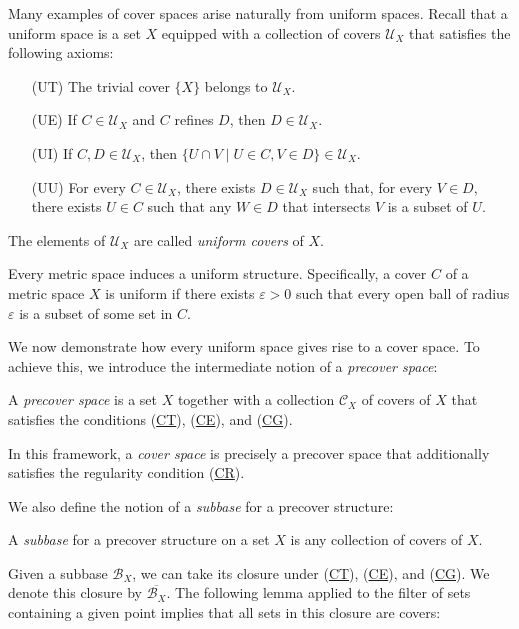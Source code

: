 \documentclass[reqno]{amsart}
\newcommand{\axitem}[1]{\phantomsection \label{ax:#1}}
\newcommand{\axref}[1]{(\hyperref[ax:#1]{#1})}
\theoremstyle{definition}
\theoremstyle{remark}
\numberwithin{figure}{section}
\begin{document}
Many examples of cover spaces arise naturally from uniform spaces.
Recall that a uniform space is a set $X$ equipped with a collection of covers $\mathcal{U}_X$ that satisfies the following axioms:

\begin{itemize}
\item[(UT)] The trivial cover $\{ X \}$ belongs to $\mathcal{U}_X$.
\item[(UE)] \axitem{UE} If $C \in \mathcal{U}_X$ and $C$ refines $D$, then $D \in \mathcal{U}_X$.
\item[(UI)] \axitem{UI} If $C,D \in \mathcal{U}_X$, then $\{ U \cap V \mid U \in C, V \in D \} \in \mathcal{U}_X$.
\item[(UU)] \axitem{UU} For every $C \in \mathcal{U}_X$, there exists $D \in \mathcal{U}_X$ such that, for every $V \in D$,
there exists $U \in C$ such that any $W \in D$ that intersects $V$ is a subset of $U$.
\end{itemize}
The elements of $\mathcal{U}_X$ are called \emph{uniform covers} of $X$.

\begin{example}
Every metric space induces a uniform structure.
Specifically, a cover $C$ of a metric space $X$ is uniform if there exists $\varepsilon > 0$ such that every open ball of radius $\varepsilon$ is a subset of some set in $C$.
\end{example}

We now demonstrate how every uniform space gives rise to a cover space.
To achieve this, we introduce the intermediate notion of a \emph{precover space}:

\begin{defn}
A \emph{precover space} is a set $X$ together with a collection $\mathcal{C}_X$ of covers of $X$ that satisfies the conditions \axref{CT}, \axref{CE}, and \axref{CG}.
\end{defn}

In this framework, a \emph{cover space} is precisely a precover space that additionally satisfies the regularity condition \axref{CR}.

We also define the notion of a \emph{subbase} for a precover structure:

\begin{defn}
A \emph{subbase} for a precover structure on a set $X$ is any collection of covers of $X$.
\end{defn}

Given a subbase $\mathcal{B}_X$, we can take its closure under \axref{CT}, \axref{CE}, and \axref{CG}.
We denote this closure by $\overline{\mathcal{B}_X}$.
The following lemma applied to the filter of sets containing a given point implies that all sets in this closure are covers:
\end{document}
